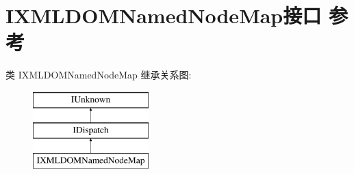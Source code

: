 \hypertarget{interface_i_x_m_l_d_o_m_named_node_map}{}\section{I\+X\+M\+L\+D\+O\+M\+Named\+Node\+Map接口 参考}
\label{interface_i_x_m_l_d_o_m_named_node_map}
类 I\+X\+M\+L\+D\+O\+M\+Named\+Node\+Map 继承关系图\+:\begin{figure}[H]
\begin{center}
\leavevmode
\includegraphics[height=3.000000cm]{interface_i_x_m_l_d_o_m_named_node_map}
\end{center}
\end{figure}
